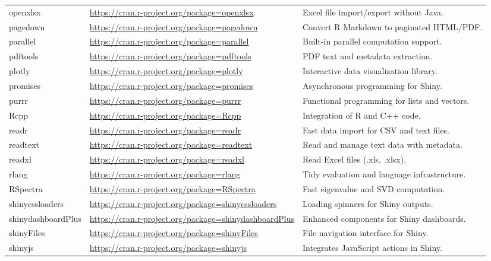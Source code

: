 \documentclass[8pt,a4paper]{article}
\begin{document}
\begin{longtable}{p{3cm} p{5.5cm} p{7.5cm}}
\textsf{openxlsx} & \url{https://cran.r-project.org/package=openxlsx} & Excel file import/export without Java. \\
\textsf{pagedown} & \url{https://cran.r-project.org/package=pagedown} & Convert \textsf{R} Markdown to paginated HTML/PDF. \\
\textsf{parallel} & \url{https://cran.r-project.org/package=parallel} & Built-in parallel computation support. \\
\textsf{pdftools} & \url{https://cran.r-project.org/package=pdftools} & PDF text and metadata extraction. \\
\textsf{plotly} & \url{https://cran.r-project.org/package=plotly} & Interactive data visualization library. \\
\textsf{promises} & \url{https://cran.r-project.org/package=promises} & Asynchronous programming for Shiny. \\
\textsf{purrr} & \url{https://cran.r-project.org/package=purrr} & Functional programming for lists and vectors. \\
\textsf{Rcpp} & \url{https://cran.r-project.org/package=Rcpp} & Integration of \textsf{R} and C++ code. \\
\textsf{readr} & \url{https://cran.r-project.org/package=readr} & Fast data import for CSV and text files. \\
\textsf{readtext} & \url{https://cran.r-project.org/package=readtext} & Read and manage text data with metadata. \\
\textsf{readxl} & \url{https://cran.r-project.org/package=readxl} & Read Excel files (.xls, .xlsx). \\
\textsf{rlang} & \url{https://cran.r-project.org/package=rlang} & Tidy evaluation and language infrastructure. \\
\textsf{RSpectra} & \url{https://cran.r-project.org/package=RSpectra} & Fast eigenvalue and SVD computation. \\
\textsf{shinycssloaders} & \url{https://cran.r-project.org/package=shinycssloaders} & Loading spinners for Shiny outputs. \\
\textsf{shinydashboardPlus} & \url{https://cran.r-project.org/package=shinydashboardPlus} & Enhanced components for Shiny dashboards. \\
\textsf{shinyFiles} & \url{https://cran.r-project.org/package=shinyFiles} & File navigation interface for Shiny. \\
\textsf{shinyjs} & \url{https://cran.r-project.org/package=shinyjs} & Integrates JavaScript actions in Shiny. \\

\end{longtable}
\end{document}
